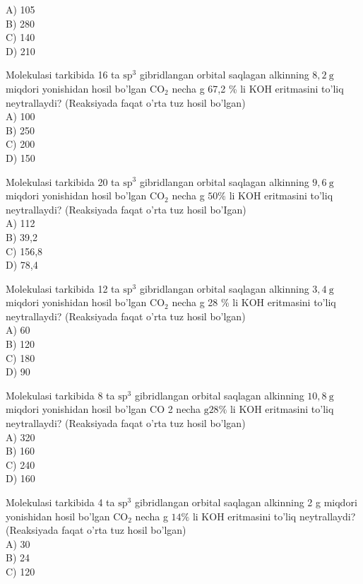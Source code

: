 A) 105\\
B) 280\\
C) 140\\
D) 210
  \item Molekulasi tarkibida 16 ta $\mathrm{sp}^{3}$ gibridlangan orbital saqlagan alkinning $8,2 \mathrm{~g}$ miqdori yonishidan hosil bo'lgan $\mathrm{CO}_{2}$ necha g 67,2 \% li KOH eritmasini to'liq neytrallaydi? (Reaksiyada faqat o'rta tuz hosil bo'lgan)\\
A) 100\\
B) 250\\
C) 200\\
D) 150
  \item Molekulasi tarkibida 20 ta $\mathrm{sp}^{3}$ gibridlangan orbital saqlagan alkinning $9,6 \mathrm{~g}$ miqdori yonishidan hosil bo'lgan $\mathrm{CO}_{2}$ necha g $50 \%$ li KOH eritmasini to'liq neytrallaydi? (Reaksiyada faqat o'rta tuz hosil bo'Igan)\\
A) 112\\
B) 39,2\\
C) 156,8\\
D) 78,4
  \item Molekulasi tarkibida 12 ta $\mathrm{sp}^{3}$ gibridlangan orbital saqlagan alkinning $3,4 \mathrm{~g}$ miqdori yonishidan hosil bo'lgan $\mathrm{CO}_{2}$ necha g 28 \% li KOH eritmasini to'liq neytrallaydi? (Reaksiyada faqat o'rta tuz hosil bo'lgan)\\
A) 60\\
B) 120\\
C) 180\\
D) 90
  \item Molekulasi tarkibida 8 ta $\mathrm{sp}^{3}$ gibridlangan orbital saqlagan alkinning $10,8 \mathrm{~g}$ miqdori yonishidan hosil bo'lgan CO 2 necha $\mathrm{g} 28 \%$ li KOH eritmasini to'liq neytrallaydi? (Reaksiyada faqat o'rta tuz hosil bo'lgan)\\
A) 320\\
B) 160\\
C) 240\\
D) 160
  \item Molekulasi tarkibida 4 ta $\mathrm{sp}^{3}$ gibridlangan orbital saqlagan alkinning 2 g miqdori yonishidan hosil bo'lgan $\mathrm{CO}_{2}$ necha g $14 \%$ li KOH eritmasini to'liq neytrallaydi? (Reaksiyada faqat o'rta tuz hosil bo'lgan)\\
A) 30\\
B) 24\\
C) 120\\
